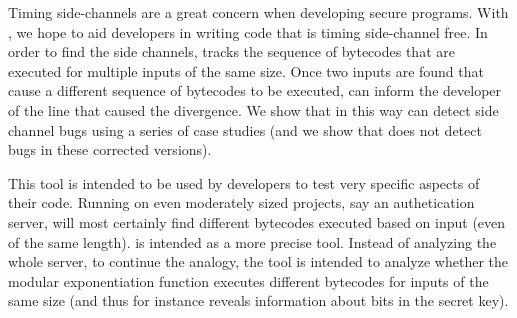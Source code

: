 Timing side-channels are a great concern when developing 
secure programs. With \jcupid, we hope to aid developers in writing
code that is timing side-channel free. In order to find the side
channels, \jcupid 
tracks the sequence of bytecodes that are executed for multiple inputs
of the same size. Once two inputs are found that cause a different
sequence of bytecodes to be executed, \jcupid can inform the developer
of the line that caused the
divergence. We show that in this way \jcupid can detect side channel
bugs using a series of case studies (and we show that \jcupid does not
detect bugs in these corrected versions).

This tool is intended to be used by developers to test very
specific aspects of their code. Running \jcupid on even moderately sized
projects, say an authetication server, will most
certainly find different bytecodes executed based on input (even of
the same length). \jcupid is intended as a more precise tool. Instead of 
analyzing the whole server, to continue the analogy, the tool is
intended to analyze whether the modular exponentiation function
executes different bytecodes for inputs of the same size (and thus for
instance reveals information about bits in the secret key). 
